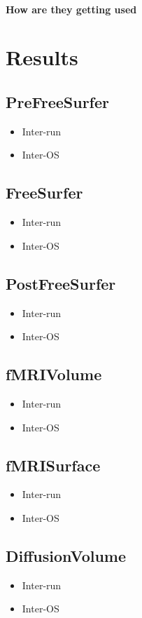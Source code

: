 \paragraph{How are they getting used}

\section{Results}

\subsection{PreFreeSurfer}
  \begin{itemize}
    \item Inter-run
    \item Inter-OS
  \end{itemize}
  
\subsection{FreeSurfer}
\begin{itemize}
    \item Inter-run
    \item Inter-OS
  \end{itemize}
  
\subsection{PostFreeSurfer}
\begin{itemize}
    \item Inter-run
    \item Inter-OS
  \end{itemize}
  
\subsection{fMRIVolume}
\begin{itemize}
    \item Inter-run
    \item Inter-OS
  \end{itemize}
  
\subsection{fMRISurface}
\begin{itemize}
    \item Inter-run
    \item Inter-OS
  \end{itemize}
  
\subsection{DiffusionVolume}
\begin{itemize}
    \item Inter-run
    \item Inter-OS
  \end{itemize}

